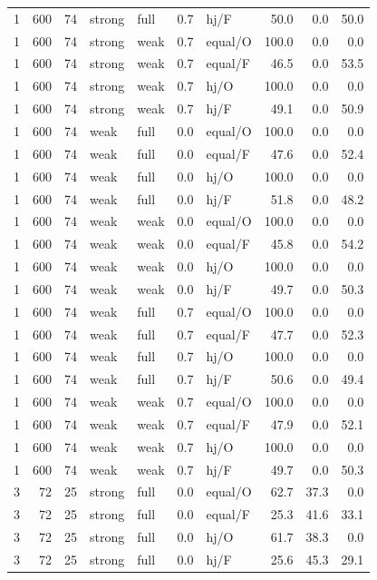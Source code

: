 {\begin{longtable}{@{}rrrllllrrr@{}}
1 & 600 & 74 & strong & full & 0.7 & hj/F & 50.0 & 0.0 & 50.0\\
1 & 600 & 74 & strong & weak & 0.7 & equal/O & 100.0 & 0.0 & 0.0\\
1 & 600 & 74 & strong & weak & 0.7 & equal/F & 46.5 & 0.0 & 53.5\\
1 & 600 & 74 & strong & weak & 0.7 & hj/O & 100.0 & 0.0 & 0.0\\
1 & 600 & 74 & strong & weak & 0.7 & hj/F & 49.1 & 0.0 & 50.9\\
1 & 600 & 74 & weak & full & 0.0 & equal/O & 100.0 & 0.0 & 0.0\\
1 & 600 & 74 & weak & full & 0.0 & equal/F & 47.6 & 0.0 & 52.4\\
1 & 600 & 74 & weak & full & 0.0 & hj/O & 100.0 & 0.0 & 0.0\\
1 & 600 & 74 & weak & full & 0.0 & hj/F & 51.8 & 0.0 & 48.2\\
1 & 600 & 74 & weak & weak & 0.0 & equal/O & 100.0 & 0.0 & 0.0\\
1 & 600 & 74 & weak & weak & 0.0 & equal/F & 45.8 & 0.0 & 54.2\\
1 & 600 & 74 & weak & weak & 0.0 & hj/O & 100.0 & 0.0 & 0.0\\
1 & 600 & 74 & weak & weak & 0.0 & hj/F & 49.7 & 0.0 & 50.3\\
1 & 600 & 74 & weak & full & 0.7 & equal/O & 100.0 & 0.0 & 0.0\\
1 & 600 & 74 & weak & full & 0.7 & equal/F & 47.7 & 0.0 & 52.3\\
1 & 600 & 74 & weak & full & 0.7 & hj/O & 100.0 & 0.0 & 0.0\\
1 & 600 & 74 & weak & full & 0.7 & hj/F & 50.6 & 0.0 & 49.4\\
1 & 600 & 74 & weak & weak & 0.7 & equal/O & 100.0 & 0.0 & 0.0\\
1 & 600 & 74 & weak & weak & 0.7 & equal/F & 47.9 & 0.0 & 52.1\\
1 & 600 & 74 & weak & weak & 0.7 & hj/O & 100.0 & 0.0 & 0.0\\
1 & 600 & 74 & weak & weak & 0.7 & hj/F & 49.7 & 0.0 & 50.3\\
3 & 72 & 25 & strong & full & 0.0 & equal/O & 62.7 & 37.3 & 0.0\\
3 & 72 & 25 & strong & full & 0.0 & equal/F & 25.3 & 41.6 & 33.1\\
3 & 72 & 25 & strong & full & 0.0 & hj/O & 61.7 & 38.3 & 0.0\\
3 & 72 & 25 & strong & full & 0.0 & hj/F & 25.6 & 45.3 & 29.1\\

\end{longtable}}
